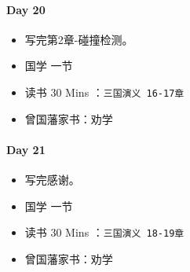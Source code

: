 \documentclass[UTF8,a4paper,8pt]{ctexart}
\begin{document}
 	 \paragraph{Day 20      \quad     }
	 	 \begin{itemize}[itemindent = 1em]
	 	 	\renewcommand\labelitemi{\makebox[0pt][l]{$\square$}\raisebox{.15ex}{\hspace{0.1em}$\checkmark$}}		
	 	 	
	 	 	\item    写完第2章-碰撞检测。
	 	 	
	 	 	
	 	 	\renewcommand\labelitemi{\makebox[0pt][l]{$\square$}\hspace{1em}}
	 	 	\item   国学  一节
	 	 	\item   读书  30 Mins	：\verb|三国演义 16-17章|
	 	 	\item   曾国藩家书：劝学
	 	 \end{itemize}
 	 \paragraph{Day 21      \quad     }
	 	 \begin{itemize}[itemindent = 1em]
	 	 	\renewcommand\labelitemi{\makebox[0pt][l]{$\square$}\raisebox{.15ex}{\hspace{0.1em}$\checkmark$}}		
	 	 	
	 	 	\item    写完感谢。
	 	 	
	 	 	
	 	 	\renewcommand\labelitemi{\makebox[0pt][l]{$\square$}\hspace{1em}}
	 	 	\item   国学  一节
	 	 	\item   读书  30 Mins	：\verb|三国演义 18-19章|
	 	 	\item   曾国藩家书：劝学
	 	 \end{itemize}
\end{document}
